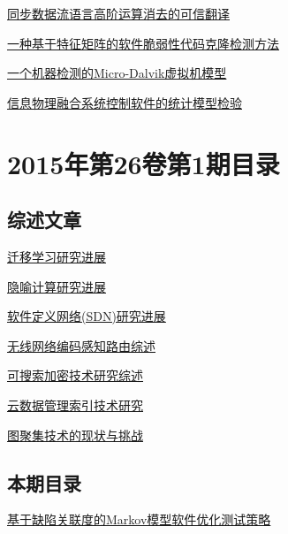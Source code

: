 \documentclass[a4paper]{article}
\begin{document}
\href{http://www.jos.org.cn/ch/reader/download_pdf.aspx?file_no=4785&year_id=2015&quarter_id=2&falg=1}{同步数据流语言高阶运算消去的可信翻译}

\href{http://www.jos.org.cn/ch/reader/download_pdf.aspx?file_no=4786&year_id=2015&quarter_id=2&falg=1}{一种基于特征矩阵的软件脆弱性代码克隆检测方法}

\href{http://www.jos.org.cn/ch/reader/download_pdf.aspx?file_no=4787&year_id=2015&quarter_id=2&falg=1}{一个机器检测的Micro-Dalvik虚拟机模型}

\href{http://www.jos.org.cn/ch/reader/download_pdf.aspx?file_no=4788&year_id=2015&quarter_id=2&falg=1}{信息物理融合系统控制软件的统计模型检验}


\section{\textbf{2015年第26卷第1期目录}}
\subsection{综述文章}
\href{http://www.jos.org.cn/ch/reader/download_pdf.aspx?file_no=4631&year_id=2015&quarter_id=1&falg=1}{迁移学习研究进展}

\href{http://www.jos.org.cn/ch/reader/download_pdf.aspx?file_no=4669&year_id=2015&quarter_id=1&falg=1}{隐喻计算研究进展}

\href{http://www.jos.org.cn/ch/reader/download_pdf.aspx?file_no=4701&year_id=2015&quarter_id=1&falg=1}{软件定义网络(SDN)研究进展}

\href{http://www.jos.org.cn/ch/reader/download_pdf.aspx?file_no=4696&year_id=2015&quarter_id=1&falg=1}{无线网络编码感知路由综述}

\href{http://www.jos.org.cn/ch/reader/download_pdf.aspx?file_no=4700&year_id=2015&quarter_id=1&falg=1}{可搜索加密技术研究综述}

\href{http://www.jos.org.cn/ch/reader/download_pdf.aspx?file_no=4688&year_id=2015&quarter_id=1&falg=1}{云数据管理索引技术研究}

\href{http://www.jos.org.cn/ch/reader/download_pdf.aspx?file_no=4692&year_id=2015&quarter_id=1&falg=1}{图聚集技术的现状与挑战}

\subsection{本期目录}
\href{http://www.jos.org.cn/ch/reader/download_pdf.aspx?file_no=4672&year_id=2015&quarter_id=1&falg=1}{基于缺陷关联度的Markov模型软件优化测试策略}
\end{document}
